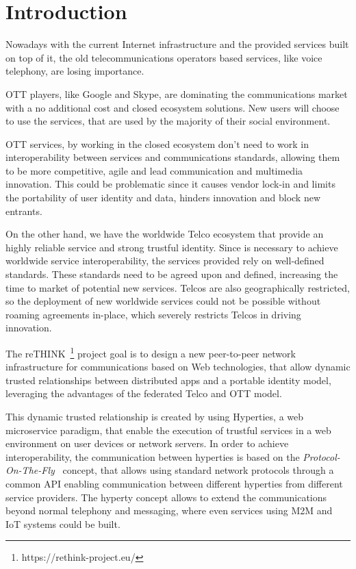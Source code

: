 \chapter{Introduction}
\label{chapter:introduction}
Nowadays with the current Internet infrastructure and the provided services built on top of it, the old telecommunications operators based services, like voice telephony, are losing importance.

\ac{OTT} players, like Google and Skype, are dominating the communications market with a no additional cost and closed ecosystem solutions.
New users will choose to use the services, that are used by the majority of their social environment.

\ac{OTT} services, by working in the closed ecosystem don't need to work in interoperability between services and communications standards, allowing them to be more competitive, agile and lead communication and multimedia innovation.
This could be problematic since it causes vendor lock-in and limits the portability of user identity and data, hinders innovation and block new entrants.

On the other hand, we have the worldwide Telco ecosystem that provide an highly reliable service and strong trustful identity.
Since is necessary to achieve worldwide service interoperability, the services provided rely on well-defined standards. These standards need to be agreed upon and defined, increasing the time to market of potential new services.
Telcos are also geographically restricted, so the deployment of new worldwide services could not be possible without roaming agreements in-place, which severely restricts Telcos in driving innovation.

The reTHINK~\footnote{https://rethink-project.eu/} project goal is to design a new peer-to-peer network infrastructure for communications based on Web technologies, that allow dynamic trusted relationships between distributed apps and a portable identity model, leveraging the advantages of the federated Telco and \ac{OTT} model.

This dynamic trusted relationship is created by using \ac{Hyperties}, a web microservice paradigm, that enable the execution of trustful services in a web environment on user devices or network servers.
In order to achieve interoperability, the communication between hyperties is based on the \textit{Protocol-On-The-Fly}~\cite{protofly} concept, that allows using standard network protocols through a common API enabling communication between different hyperties from different service providers.
The hyperty concept allows to extend the communications beyond normal telephony and messaging, where even services using \ac{M2M} and \ac{IoT} systems could be built.


